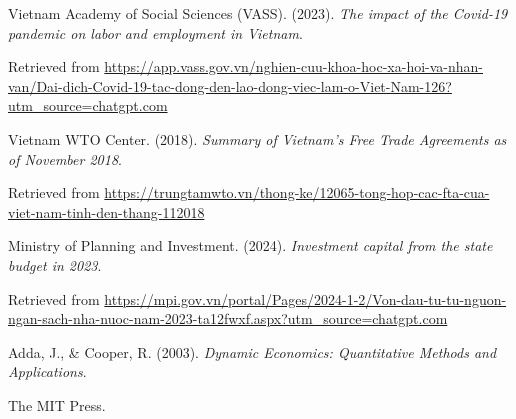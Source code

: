 \documentclass{article}
\begin{document}
\vspace{1em}

Vietnam Academy of Social Sciences (VASS). (2023). \textit{The impact of the Covid-19 pandemic on labor and employment in Vietnam}.  

Retrieved from \url{https://app.vass.gov.vn/nghien-cuu-khoa-hoc-xa-hoi-va-nhan-van/Dai-dich-Covid-19-tac-dong-den-lao-dong-viec-lam-o-Viet-Nam-126?utm_source=chatgpt.com}

\vspace{1em}

Vietnam WTO Center. (2018). \textit{Summary of Vietnam's Free Trade Agreements as of November 2018}.  

Retrieved from \url{https://trungtamwto.vn/thong-ke/12065-tong-hop-cac-fta-cua-viet-nam-tinh-den-thang-112018}

\vspace{1em}

Ministry of Planning and Investment. (2024). \textit{Investment capital from the state budget in 2023}.  

Retrieved from \url{https://mpi.gov.vn/portal/Pages/2024-1-2/Von-dau-tu-tu-nguon-ngan-sach-nha-nuoc-nam-2023-ta12fwxf.aspx?utm_source=chatgpt.com}

\vspace{1em}

Adda, J., \& Cooper, R. (2003). \textit{Dynamic Economics: Quantitative Methods and Applications}.  

The MIT Press.
\end{document}
